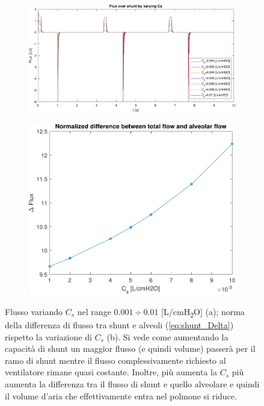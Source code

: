 \begin{figure}[t!]
	\begin{subfigure}{0.6\linewidth}
		\centering
		\includegraphics[width=0.95\linewidth]{../model/data_log/Cs_fluxCS.pdf}
		\caption{}
	\end{subfigure}\hfill
	\begin{subfigure}{0.4\linewidth}
		\centering
		\includegraphics[width=0.95\linewidth]{../model/data_log/CwCL_deltaflux.pdf}
		\caption{}
		 \label{fig:flusso_shunt_delta}
	\end{subfigure}\hfill
	\caption{Flusso variando $C_s$ nel range $0.001\div 0.01$ [L/cmH\textsubscript{2}O] (a); norma della differenza di flusso tra shunt e alveoli (\cref{eq:shunt_Delta}) rispetto la variazione di $C_s$ (b). Si vede come aumentando la capacità di shunt un maggior flusso (e quindi volume) passerà per il ramo di shunt mentre il flusso complessivamente richiesto al ventilatore rimane quasi costante. Inoltre, più aumenta la $C_s$ più aumenta la differenza tra il flusso di shunt e quello alveolare e quindi il volume d'aria che effettivamente entra nel polmone si riduce. }
	\label{fig:flusso_shunt}
\end{figure}

